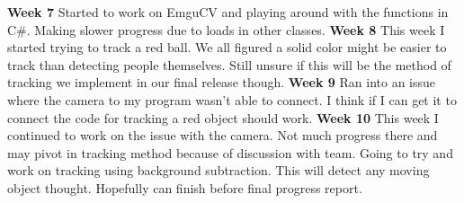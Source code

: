 \documentclass[onecolumn, draftclsnofoot,10pt, compsoc]{IEEEtran}
\begin{document}
\newline
\textbf{Week 7}
\newline
Started to work on EmguCV and playing around with the functions in C\#. Making slower progress due to loads in other classes.
\newline
\textbf{Week 8}
\newline
This week I started trying to track a red ball. We all figured a solid color might be easier to track than detecting people themselves. Still unsure if this will be the method of tracking we implement in our final release though.
\newline
\textbf{Week 9}
\newline
Ran into an issue where the camera to my program wasn't able to connect. I think if I can get it to connect the code for tracking a red object should work.
\newline
\textbf{Week 10}
\newline
This week I continued to work on the issue with the camera. Not much progress there and may pivot in tracking method because of discussion with team. Going to try and work on tracking using background subtraction. This will detect any moving object thought. Hopefully can finish before final progress report.
\end{document}
